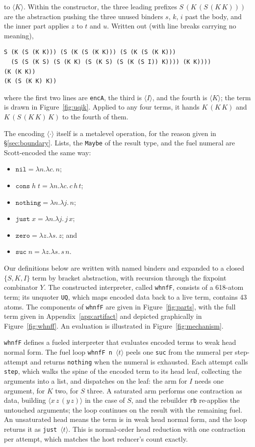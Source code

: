 \documentclass[review]{jfp-epi}
\begin{document}
to $\langle K\rangle$. Within the constructor, the three leading prefixes
$S\,(K\,(S\,(K\,K)))$ are the abstraction pushing the three unused
binders $s$, $k$, $i$ past the body, and the inner part applies $z$ to
$t$ and $u$. Written out (with line breaks carrying no meaning),
\begin{verbatim}
S (K (S (K K))) (S (K (S (K K))) (S (K (S (K K)))
  (S (S (K S) (S (K K) (S (K S) (S (K (S I)) K)))) (K K))))
(K (K K))
(K (S (K K) K))
\end{verbatim}
where the first two lines are \texttt{encA}, the third is
$\langle I\rangle$, and the fourth is $\langle K\rangle$; the term is
drawn in Figure~\ref{fig:uqik}. Applied to any four terms, it hands
$K\,(K\,K)$ and $K\,(S\,(K\,K)\,K)$ to the fourth of them.

The encoding $\langle\cdot\rangle$ itself is a
metalevel operation, for the reason given in \S\ref{sec:boundary}.
Lists, the \texttt{Maybe} of the result type, and the fuel numeral are
Scott-encoded the same way:
\begin{itemize}[nosep]
  \item  $\texttt{nil} = \lambda n.\lambda c.\,n$;
  \item  $\texttt{cons}\;h\;t = \lambda n.\lambda c.\,c\,h\,t$;
  \item  $\texttt{nothing} = \lambda n.\lambda j.\,n$;
  \item  $\texttt{just}\;x = \lambda n.\lambda j.\,j\,x$;
  \item  $\texttt{zero} = \lambda z.\lambda s.\,z$; and
  \item  $\texttt{suc}\;n = \lambda z.\lambda s.\,s\,n$.
\end{itemize}
Our definitions below
are written with named binders and expanded to a closed $\{S,K,I\}$ term
by bracket abstraction, with recursion through the fixpoint combinator
$Y$. The constructed interpreter, called \texttt{whnfF}, consists of a
618-atom term; its unquoter \texttt{UQ}, which maps encoded data back to
a live term, contains 43 atoms.  The components of \texttt{whnfF} are
given in Figure~\ref{fig:parts}, with the full term given in
Appendix~\ref{app:artifact} and depicted graphically in
Figure~\ref{fig:whnff}.
An evaluation is illustrated in Figure~\ref{fig:mechanism}.

\texttt{whnfF} defines a fueled interpreter that evaluates encoded terms to
weak head normal form.  The fuel loop \texttt{whnfF n $\langle t\rangle$}
peels one \texttt{suc}
from the numeral per step-attempt and returns \texttt{nothing} when the
numeral is exhausted. Each attempt calls \texttt{step}, which walks the
spine of the encoded term to its head leaf, collecting the arguments
into a list, and dispatches on the leaf: the arm for $I$ needs one
argument, for $K$ two, for $S$ three. A saturated arm performs one
contraction as data, building $\langle x\,z\,(y\,z)\rangle$ in the case
of $S$, and the rebuilder \texttt{rb} re-applies the untouched arguments;
the loop continues on the result with the remaining fuel. An unsaturated
head means the term is in weak head normal form, and the loop returns it
as \texttt{just $\langle t\rangle$}. This is normal-order head reduction
with one contraction per attempt, which matches the host reducer's count
exactly.
\end{document}
